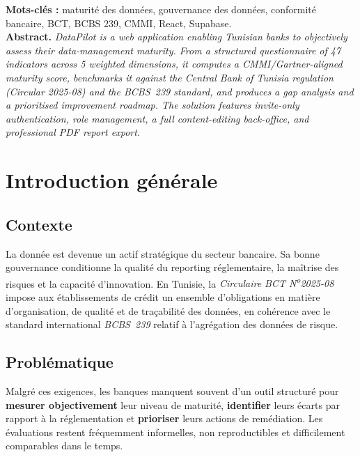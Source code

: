 \documentclass[11pt,a4paper]{report}
\begin{document}
\textbf{Mots-clés :} maturité des données, gouvernance des données, conformité
bancaire, BCT, BCBS 239, CMMI, React, Supabase.\\

\noindent\textbf{Abstract.} \textit{DataPilot is a web application enabling
Tunisian banks to objectively assess their data-management maturity. From a
structured questionnaire of 47 indicators across 5 weighted dimensions, it
computes a CMMI/Gartner-aligned maturity score, benchmarks it against the
Central Bank of Tunisia regulation (Circular 2025-08) and the BCBS~239 standard,
and produces a gap analysis and a prioritised improvement roadmap. The solution
features invite-only authentication, role management, a full content-editing
back-office, and professional PDF report export.}

\tableofcontents

\chapter{Introduction générale}

\section{Contexte}
La donnée est devenue un actif stratégique du secteur bancaire. Sa bonne
gouvernance conditionne la qualité du reporting réglementaire, la maîtrise des
risques et la capacité d'innovation. En Tunisie, la \emph{Circulaire BCT
N\textsuperscript{o}2025-08} impose aux établissements de crédit un ensemble
d'obligations en matière d'organisation, de qualité et de traçabilité des
données, en cohérence avec le standard international \emph{BCBS~239} relatif à
l'agrégation des données de risque.

\section{Problématique}
Malgré ces exigences, les banques manquent souvent d'un outil structuré pour
\textbf{mesurer objectivement} leur niveau de maturité, \textbf{identifier} leurs
écarts par rapport à la réglementation et \textbf{prioriser} leurs actions de
remédiation. Les évaluations restent fréquemment informelles, non reproductibles
et difficilement comparables dans le temps.
\end{document}
